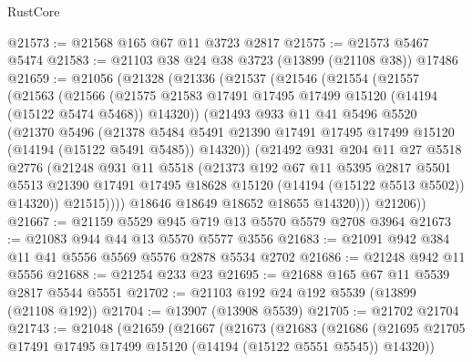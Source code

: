 \begin{lexlean}{RustCore}
\begin{coremodule}
@21573 := @21568 @165 @67 @11 @3723 @2817
@21575 := @21573 @5467 @5474
@21583 := @21103 @38 @24 @38 @3723 (@13899 (@21108 @38)) @17486
@21659 := @21056
    (@21328
      (@21336
        (@21537
          (@21546
            (@21554
              (@21557
                (@21563
                  (@21566
                    (@21575
                      @21583
                      @17491
                      @17495
                      @17499
                      @15120
                      (@14194 (@15122 @5474 @5468))
                      @14320))
                  (@21493
                    @933
                    @11
                    @41
                    @5496
                    @5520
                    (@21370
                      @5496
                      (@21378
                        @5484
                        @5491
                        @21390
                        @17491
                        @17495
                        @17499
                        @15120
                        (@14194 (@15122 @5491 @5485))
                        @14320))
                    (@21492
                      @931
                      @204
                      @11
                      @27
                      @5518
                      @2776
                      (@21248
                        @931
                        @11
                        @5518
                        (@21373
                          @192
                          @67
                          @11
                          @5395
                          @2817
                          @5501
                          @5513
                          @21390
                          @17491
                          @17495
                          @18628
                          @15120
                          (@14194 (@15122 @5513 @5502))
                          @14320))
                      @21515))))
              @18646
              @18649
              @18652
              @18655
              @14320)))
        @21206))
@21667 := @21159 @5529 @945 @719 @13 @5570 @5579 @2708 @3964
@21673 := @21083 @944 @44 @13 @5570 @5577 @3556
@21683 := @21091 @942 @384 @11 @41 @5556 @5569 @5576 @2878 @5534 @2702
@21686 := @21248 @942 @11 @5556
@21688 := @21254 @233 @23
@21695 := @21688 @165 @67 @11 @5539 @2817 @5544 @5551
@21702 := @21103 @192 @24 @192 @5539 (@13899 (@21108 @192))
@21704 := @13907 (@13908 @5539)
@21705 := @21702 @21704
@21743 := @21048
    (@21659
      (@21667
        (@21673
          (@21683
            (@21686
              (@21695 @21705 @17491 @17495 @17499 @15120 (@14194 (@15122 @5551 @5545)) @14320))

\end{coremodule}
\end{lexlean}
